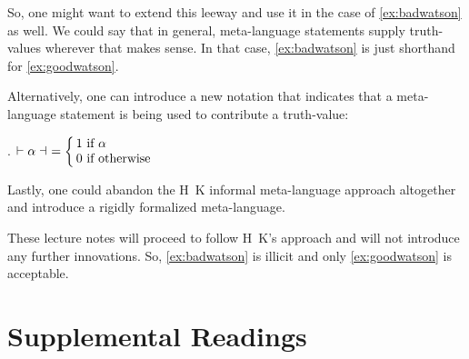 So, %
%
one might want to extend this leeway and use it in the case of
\ref{ex:badwatson} as well. We could say that in general,
meta-language statements supply truth-values wherever that makes
sense. In that case, \ref{ex:badwatson} is just shorthand for \ref{ex:goodwatson}.

\newcommand{\nupsis}[1]{\ensuremath{\vdash #1 \dashv}}

Alternatively, %
%
one can introduce a new notation that indicates that a meta-language
statement is being used to contribute a truth-value:

\ex. $\nupsis{\alpha}\ = \leftchoice{1 if $\alpha$,0 if otherwise}$

Lastly, one could abandon the H\amp\ K informal meta-language approach
altogether and introduce a rigidly formalized meta-language. 

These lecture notes will proceed to follow H\amp\ K's approach and
will not introduce any further innovations. So, \ref{ex:badwatson} is
illicit and only \ref{ex:goodwatson} is acceptable.
\section{Supplemental Readings}

